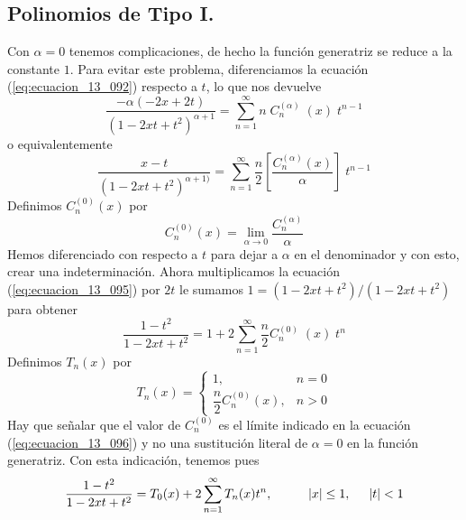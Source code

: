 \subsection{Polinomios de Tipo I.}
Con $\alpha=0$ tenemos complicaciones, de hecho la función generatriz se reduce a la constante $1$. Para evitar este problema, diferenciamos la ecuación (\ref{eq:ecuacion_13_092}) respecto a $t$, lo que nos devuelve
\begin{equation}
\dfrac{-\alpha(-2x + 2t)}{(1 - 2xt + t^{2})^{\alpha+1}} = \sum_{n=1}^{\infty} n \; C_{n}^{(\alpha)} \; (x) \; t^{n-1}
\label{eq:ecuacion_13_094}
\end{equation}
o equivalentemente
\begin{equation}
\dfrac{x - t}{(1 - 2xt + t^{2})^{\alpha + 1)}} = \sum_{n=1}^{\infty} \dfrac{n}{2} \left[ \dfrac{C_{n}^{(\alpha)} (x)}{\alpha} \right] \; t^{n-1}
\label{eq:ecuacion_13_095}
\end{equation}
Definimos $C_{n}^{(0)} (x)$ por
\begin{equation}
C_{n}^{(0)} (x) = \lim_{\alpha \to 0} \dfrac{C_{n}^{(\alpha)}}{\alpha}
\label{eq:ecuacion_13_096}
\end{equation}
Hemos diferenciado con respecto a $t$ para dejar a $\alpha$ en el denominador y con esto, crear una indeterminación. Ahora multiplicamos la ecuación (\ref{eq:ecuacion_13_095}) por $2t$ le sumamos $1 = (1 - 2xt + t^{2}) / (1 - 2xt + t^{2})$ para obtener
\begin{equation}
\dfrac{1 - t^{2}}{1 - 2xt + t^{2}} =  1 + 2 \sum_{n=1}^{\infty} \dfrac{n}{2} C_{n}^{(0)} \; (x) \; t^{n}
\label{eq:ecuacion_13_097}
\end{equation}
Definimos $T_{n}(x)$ por
\begin{equation}
T_{n}(x) = \begin{cases}
1, & n=0 \\
\dfrac{n}{2} C_{n}^{(0)} (x), & n>0
\end{cases}
\label{eq:ecuacion_13_098} 
\end{equation}
Hay que señalar que el valor de $C_{n}^{(0)}$ es el límite indicado en la ecuación (\ref{eq:ecuacion_13_096}) y no una sustitución literal de $\alpha=0$ en la función generatriz. Con esta indicación, tenemos pues
\begin{equation}
\dfrac{1 - t^{2}}{1 - 2xt + t^{2}} = T_{0} (x) +  2 \sum_{n=1}^{\infty} T_{n} (x) t^{n}, \hspace{1cm} \vert x \vert \leq 1, \hspace{0.5cm} \vert t \vert < 1
\label{eq:ecuacion_13_099}
\end{equation}
